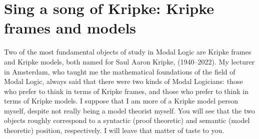 \chapter[Kripke frames and models]{Sing a song of Kripke: Kripke frames and models}

Two of the most fundamental objects of study in Modal Logic are Kripke frames and Kripke models, both named for Saul Aaron Kripke,
(1940--2022). My lecturer in Amsterdam, who taught me the mathematical foundations of the field of Modal Logic, always
said that there were two kinds of Modal Logicians: those who prefer to think in terms of Kripke frames, and those who prefer
to think in terms of Kripke models. I suppose that I am more of a Kripke model person myself, despite not really 
being a model theorist myself. You will see that the two objects roughly correspond to a syntactic (proof theoretic) and
semantic (model theoretic) position, respectively. I will leave that matter of taste to you.

